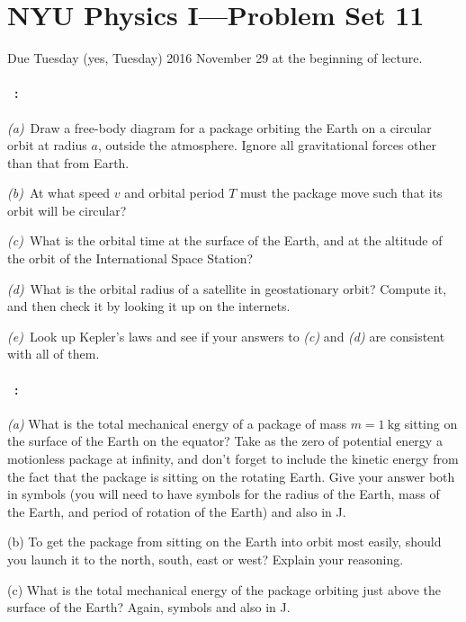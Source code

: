 \documentclass[12pt]{article}
\begin{document}
\section*{NYU Physics I---Problem Set 11}

Due Tuesday (yes, Tuesday) 2016 November 29 at the beginning of lecture.

\paragraph{\problemname~\theproblem:}%
\textsl{(a)}~Draw a free-body diagram for a package orbiting the Earth
on a circular orbit at radius $a$, outside the atmosphere. Ignore all
gravitational forces other than that from Earth.

\textsl{(b)}~At what speed $v$ and orbital period $T$ must the package
move such that its orbit will be circular?

\textsl{(c)}~What is the orbital time at the surface of the Earth, and
at the altitude of the orbit of the International Space Station?

\textsl{(d)}~What is the orbital radius of a satellite in geostationary
orbit? Compute it, and then check it by looking it up on the internets.

\textsl{(e)}~Look up Kepler's laws and see if your answers to
\textsl{(c)} and \textsl{(d)} are consistent with all of them.

\paragraph{\problemname~\theproblem:}%
\textsl{(a)} What is the total mechanical energy of a package of mass
$m= 1~\mathrm{kg}$ sitting on the surface of the Earth on the equator?
Take as the zero of potential energy a motionless package at infinity,
and don't forget to include the kinetic energy from the fact that the
package is sitting on the rotating Earth.  Give your answer both in
symbols (you will need to have symbols for the radius of the Earth,
mass of the Earth, and period of rotation of the Earth) and also in J.

(b) To get the package from sitting on the Earth into orbit most
easily, should you launch it to the north, south, east or west?
Explain your reasoning.

(c) What is the total mechanical energy of the package orbiting just
above the surface of the Earth? Again, symbols and also in J.
\end{document}
